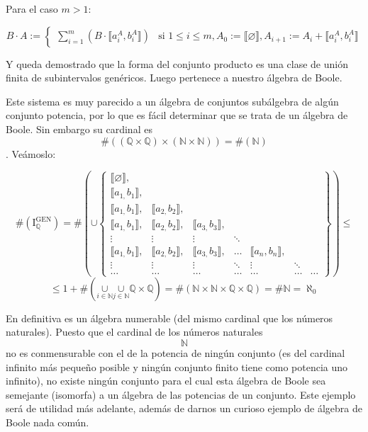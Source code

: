 \begin{enumerate}
Para el caso $m > 1$:

\[
B \cdot A := \begin{cases}
  \sum_{i=1}^{m} \left( B \cdot \llbracket a_i^A, b_i^A \rrbracket \right) & \text{si } 1 \le i \le m, A_0 := \llbracket \varnothing \rrbracket, A_{i+1} := A_i + \llbracket a_i^A, b_i^A \rrbracket
\end{cases}
\]
\end{enumerate}

Y queda demostrado que la forma del conjunto producto es una clase de
  unión finita de subintervalos genéricos. Luego pertenece a nuestro
  álgebra de Boole.

  Este sistema es muy parecido a un álgebra de conjuntos subálgebra de
  algún conjunto po\-tencia, por lo que es fácil determinar que se trata
  de un álgebra de Boole. Sin embargo su cardinal es
  \[\#{\left( {\left( {\mathbb{Q} \times \mathbb{Q}} \right) \times \left( {\mathbb{N} \times \mathbb{N}} \right)} \right) = \#}\left( \mathbb{N} \right)\].
  Veámoslo:

  \[{{\#\left( \mathbf{\mathrm{I}}_{\mathbb{Q}}^{\mathbf{\mathrm{GEN}}} \right)} = {\#\left( {\mathbf{\mathrm{\cup}}\begin{Bmatrix}
  {{⟦\varnothing ⟧},} & & & & & & \\
  {{⟦{a_{1,}b_{1}}⟧},} & & & & & & \\
  {{⟦{a_{1,}b_{1}}⟧},} & {{⟦{a_{2,}b_{2}}⟧},} & & & & & \\
  {{⟦{a_{1,}b_{1}}⟧},} & {{⟦{a_{2,}b_{2}}⟧},} & {{⟦{a_{3,}b_{3}}⟧},} & & & & \\
   \vdots & \vdots & \vdots & \ddots & & & \\
  {{⟦{a_{1,}b_{1}}⟧},} & {{⟦{a_{2,}b_{2}}⟧},} & {{⟦{a_{3,}b_{3}}⟧},} & \ldots & {{⟦{a_{n},b_{n}}⟧},} & & \\
   \vdots & \vdots & \vdots & \ddots & \vdots & \ddots & \\
  \ldots & \ldots & \ldots & \ldots & \ldots & \ldots & \ldots
  \end{Bmatrix}} \right)}} \leq\]\[{{\leq {1 + {\#\left( {\underset{i \in \mathbb{N}}{\mathbf{\mathrm{\cup}}}\underset{j \in \mathbb{N}}{\mathbf{\mathrm{\cup}}}{\mathbb{Q} \times \mathbb{Q}}} \right)}}} = \#}{\left( {{{\mathbb{N} \times \mathbb{N}} \times \mathbb{Q}} \times \mathbb{Q}} \right) = \#}{\mathbb{N} = \aleph_{0}}\]

  En definitiva es un álgebra numerable (del mismo cardinal que los
  números naturales). Puesto que el cardinal de los números naturales
  \[\mathbb{N}\]no es conmensurable con el de la potencia de ningún
  conjunto (es del cardinal infinito más pequeño posible y ningún
  conjunto finito tiene como potencia uno infinito), no existe ningún
  conjunto para el cual esta álgebra de Boole sea semejante (isomorfa) a
  un álgebra de las potencias de un conjunto. Este ejemplo será de
  utilidad más adelante, además de darnos un curioso ejemplo de álgebra
  de Boole nada común.

